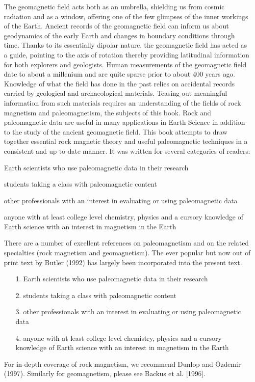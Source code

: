 \documentclass[draft,plain]{tauxe}
\begin{document}
The geomagnetic field acts both as an umbrella, shielding us from cosmic radiation and as a window,
offering one of the few glimpses of the inner workings of the Earth. Ancient records of the
geomagnetic field can inform us about geodynamics of the early Earth and changes in boundary
conditions through time. Thanks to its essentially dipolar nature, the geomagnetic field has acted as
a guide, pointing to the axis of rotation thereby providing latitudinal information for both explorers
and geologists. Human measurements of the geomagnetic field date to about a millenium and are
quite sparse prior to about 400 years ago. Knowledge of what the field has done in the past relies
on accidental records carried by geological and archaeological materials. Teasing out meaningful
information from such materials requires an understanding of the fields of rock magnetism and paleomagnetism,
the subjects of this book. Rock and paleomagnetic data are useful in many applications
in Earth Science in addition to the study of the ancient geomagnetic field. This book attempts
to draw together essential rock magnetic theory and useful paleomagnetic techniques in a consistent
and up-to-date manner. It was written for several categories of readers:
\begin{bulletlist}
\item Earth scientists who use paleomagnetic data in their research
\item students taking a class with paleomagnetic content
\item other professionals with an interest in evaluating or using paleomagnetic data
\item anyone with at least college level chemistry, physics and a cursory knowledge of Earth
science with an interest in magnetism in the Earth
\end{bulletlist}

There are a number of excellent references on paleomagnetism and on the related specialties
(rock magnetism and geomagnetism). The ever popular but now out of print text by Butler (1992)
has largely been incorporated into the present text.
\begin{enumerate}
\item[1.] Earth scientists who use paleomagnetic data in their research
\item[2.] students taking a class with paleomagnetic content
\item[3.] other professionals with an interest in evaluating or using paleomagnetic data
\item[4.] anyone with at least college level chemistry, physics and a cursory knowledge of Earth
science with an interest in magnetism in the Earth
\end{enumerate}
For in-depth coverage of rock magnetism, we
recommend Dunlop and \"{O}zdemir (1997). Similarly for geomagnetism, please see Backus et al.
[1996].
\end{document}
